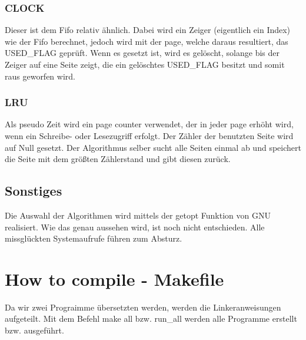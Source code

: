 \documentclass[
   draft=false
  ,paper=a4
  ,twoside=false
  ,fontsize=11pt
  ,headsepline
  ,BCOR10mm
  ,DIV11
  ,parskip=full+
]{scrartcl} %
\begin{document}
        \subsubsection{CLOCK}
        Dieser ist dem Fifo relativ ähnlich. Dabei wird ein Zeiger (eigentlich 
        ein Index) wie der Fifo berechnet, jedoch wird mit der page, welche 
        daraus resultiert, das USED\_FLAG geprüft. Wenn es gesetzt ist, wird es
        gelöscht, solange bis der Zeiger auf eine Seite zeigt, die ein 
        gelöschtes USED\_FLAG besitzt und somit raus geworfen wird.

        \subsubsection{LRU}
        Als pseudo Zeit wird ein page counter verwendet, der in jeder page 
        erhöht wird, wenn ein Schreibe- oder Lesezugriff erfolgt. 
        Der Zähler der benutzten Seite wird auf Null gesetzt. 
        Der Algorithmus selber sucht alle Seiten einmal ab und speichert die 
        Seite mit dem größten Zählerstand und gibt diesen zurück.


    \subsection{Sonstiges}
        Die Auswahl der Algorithmen wird mittels der getopt Funktion von GNU 
        realisiert. Wie das genau aussehen wird, ist noch nicht entschieden.
        Alle missglückten Systemaufrufe führen zum Absturz.
\section{How to compile - Makefile}
     Da wir zwei Prograimme übersetzten werden, werden die Linkeranweisungen 
     aufgeteilt. Mit dem Befehl make all bzw. run\_all werden alle Programme 
     erstellt bzw. ausgeführt.
\end{document}
